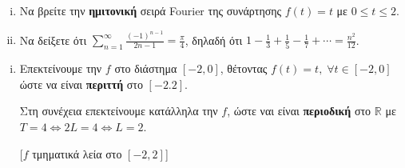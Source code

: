 \begin{mybox3}
\begin{example}
\item{}
\item{}
  \begin{enumerate}[i)]
    \item Να βρείτε την \textbf{ημιτονική} σειρά Fourier της συνάρτησης 
      $ f(t)=t $ με $ 0 \leq t \leq 2 $.
    \item Να δείξετε ότι $ \sum_{n=1}^{\infty} \frac{(-1)^{n-1}}{2n-1} = 
      \frac{\pi}{4} $, δηλαδή ότι $ 1 - \frac{1}{3} + \frac{1}{5} - \frac{1}{7}
      + \cdots = \frac{n^{2}}{12} $.
  \end{enumerate}
\end{example}
\end{mybox3}
\begin{solution}
\item {}
  \begin{enumerate}[i)]
    \item 
      Επεκτείνουμε την $f$ στο διάστημα $ [-2,0] $, θέτοντας $ f(t)=t, \; 
      \forall t \in [-2,0] $ ώστε να είναι \textbf{περιττή} στο $ [-2.2] $.

      Στη συνέχεια επεκτείνουμε κατάλληλα την $f$, ώστε ναι είναι 
      \textbf{περιοδική} στο 
      $ \mathbb{R} $ με $ T=4 \Leftrightarrow 2L=4 \Leftrightarrow \boxed{L=2} $.

      \vspace{\baselineskip}
      \begin{minipage}[t]{0.65\textwidth}
        [$f$ τμηματικά λεία στο $[-2,2]$]
      \end{minipage}


\end{enumerate}
\end{solution}
